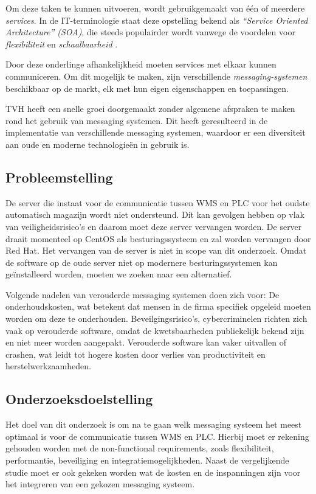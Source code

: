 Om deze taken te kunnen uitvoeren, wordt gebruikgemaakt van één of meerdere \emph{services}. 
In de IT-terminologie staat deze opstelling bekend als \emph{“Service Oriented Architecture” (SOA)}, 
die steeds populairder wordt vanwege de voordelen voor \emph{flexibiliteit} en \emph{schaalbaarheid} \autocite{Bellemare2020}.

Door deze onderlinge afhankelijkheid moeten services met elkaar kunnen communiceren. 
Om dit mogelijk te maken, zijn verschillende \emph{messaging-systemen} beschikbaar op de markt, 
elk met hun eigen eigenschappen en toepassingen.
\newline 

TVH heeft een snelle groei doorgemaakt zonder algemene afspraken te maken rond het gebruik van messaging systemen. 
Dit heeft geresulteerd in de implementatie van verschillende messaging systemen, waardoor er een diversiteit aan oude en moderne technologieën in gebruik is. 
\newline 

\subsection{Probleemstelling}
De server die instaat voor de communicatie tussen WMS en PLC voor het oudste automatisch magazijn wordt niet ondersteund.
Dit kan gevolgen hebben op vlak van veiligheidsrisico's en daarom moet deze server vervangen worden.
De server draait momenteel op CentOS als besturingssysteem en zal worden vervangen door Red Hat.
Het vervangen van de server is niet in scope van dit onderzoek. 
Omdat de software op de oude server niet op modernere besturingssystemen kan geïnstalleerd worden, 
moeten we zoeken naar een alternatief.
\newline

Volgende nadelen van verouderde messaging systemen doen zich voor: 
De onderhoudskosten, wat betekent dat mensen in de firma specifiek opgeleid moeten worden om deze te onderhouden. 
Beveilgingsrisico's, cybercriminelen richten zich vaak op verouderde software, omdat de kwetsbaarheden publiekelijk bekend zijn en niet meer worden aangepakt.
Verouderde software kan vaker uitvallen of crashen, wat leidt tot hogere kosten door verlies van productiviteit en herstelwerkzaamheden.
\newline 

\subsection{Onderzoeksdoelstelling}
Het doel van dit onderzoek is om na te gaan welk messaging systeem het meest optimaal is voor de communicatie tussen WMS en PLC. 
Hierbij moet er rekening gehouden worden met de non-functional requirements,
zoals flexibiliteit, performantie, beveiliging en integratiemogelijkheden.
Naast de vergelijkende studie moet er ook gekeken worden wat de kosten en de inspanningen zijn 
voor het integreren van een gekozen messaging systeem. \newline 

